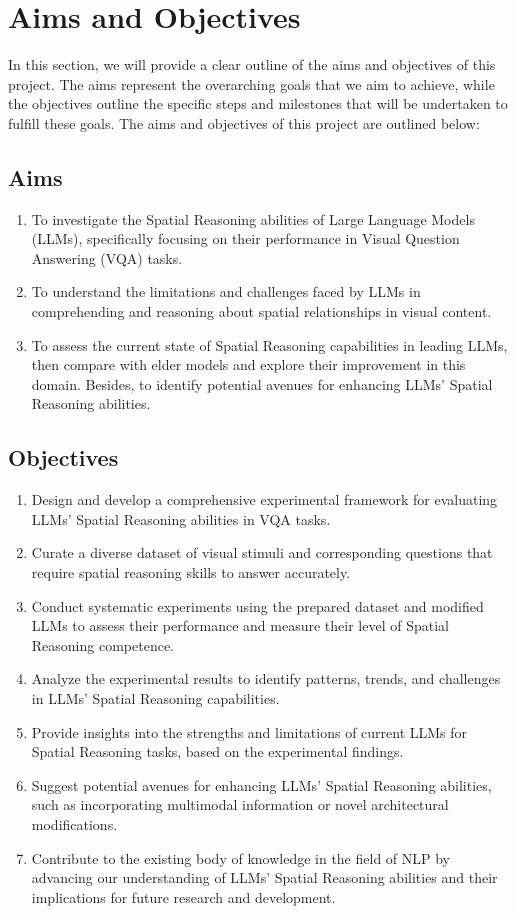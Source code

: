 \documentclass[twocolumn,11pt]{report}
\begin{document}

\chapter{Aims and Objectives}\label{chap:Aims and Objectives}

In this section, we will provide a clear outline of the aims and objectives of this project. The aims represent the overarching goals that we aim to achieve, while the objectives outline the specific steps and milestones that will be undertaken to fulfill these goals. The aims and objectives of this project are outlined below:
\section{Aims}
\begin{enumerate}
    \item To investigate the Spatial Reasoning abilities of Large Language Models (LLMs), specifically focusing on their performance in Visual Question Answering (VQA) tasks.
    \item To understand the limitations and challenges faced by LLMs in comprehending and reasoning about spatial relationships in visual content.
    \item To assess the current state of Spatial Reasoning capabilities in leading LLMs, then compare with elder models and explore their improvement in this domain. Besides, to identify potential avenues for enhancing LLMs' Spatial Reasoning abilities.
\end{enumerate}

\section{Objectives}
\begin{enumerate}
    \item Design and develop a comprehensive experimental framework for evaluating LLMs' Spatial Reasoning abilities in VQA tasks.
    \item Curate a diverse dataset of visual stimuli and corresponding questions that require spatial reasoning skills to answer accurately.
    \item Conduct systematic experiments using the prepared dataset and modified LLMs to assess their performance and measure their level of Spatial Reasoning competence.
    \item Analyze the experimental results to identify patterns, trends, and challenges in LLMs' Spatial Reasoning capabilities.
    \item Provide insights into the strengths and limitations of current LLMs for Spatial Reasoning tasks, based on the experimental findings.
    \item Suggest potential avenues for enhancing LLMs' Spatial Reasoning abilities, such as incorporating multimodal information or novel architectural modifications.
    \item Contribute to the existing body of knowledge in the field of NLP by advancing our understanding of LLMs' Spatial Reasoning abilities and their implications for future research and development.
\end{enumerate}
\end{document}
